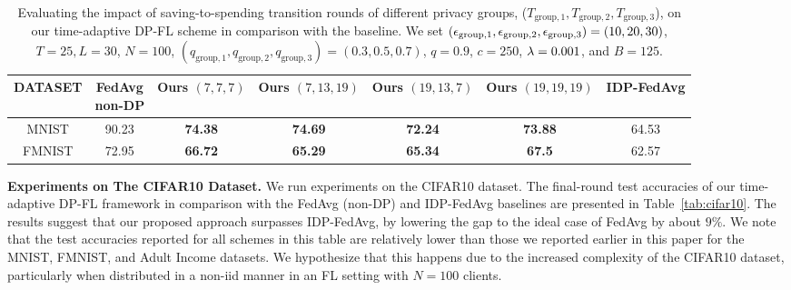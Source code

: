 {\begin{table}[h!]
\centering
\caption{
{Evaluating the impact of saving-to-spending transition rounds of different privacy groups, ($T_{\text{group},1}, T_{\text{group},2}, T_{\text{group},3}$), on our time-adaptive DP-FL scheme in comparison with the baseline. We set $({\epsilon}_{\text{group},1},{\epsilon}_{\text{group},2},{\epsilon}_{\text{group},3})=(10,20,30)$, $T=25, L=30$, $N=100$, $(q_{\text{group},1},q_{\text{group},2},q_{\text{group},3})=(0.3,0.5,0.7)$, $q=0.9$, $c=250$, $\lambda=0.001$, and $B=125$.}}
\small
\setlength{\tabcolsep}{10pt} 
\renewcommand{\arraystretch}{1.2}  
\begin{tabular}{ccccccc}
\toprule
{ \textbf{DATASET}} & \makecell[t]{{\scriptsize\textbf{FedAvg}} \\ {\scriptsize non-DP}} &  \makecell[t]{{\scriptsize\textbf{Ours}} \\ {\scriptsize $(7,7,7)$}} & \makecell[t]{{\scriptsize\textbf{Ours}} \\ {\scriptsize $(7,13,19)$}} & \makecell[t]{{\scriptsize\textbf{Ours}} \\ {\scriptsize $(19,13,7)$}} & \makecell[t]{{\scriptsize\textbf{Ours}} \\ {\scriptsize $(19,19,19)$}} & {\scriptsize \textbf{IDP-FedAvg}}\\ 
\midrule
MNIST & 90.23 & \textbf{74.38}  & \textbf{74.69}  & \textbf{72.24} & \textbf{73.88} & 64.53  \\  
\midrule
FMNIST & 72.95 & \textbf{66.72}  & \textbf{65.29}  & \textbf{65.34} & \textbf{67.5} & 62.57  \\  
\midrule
\end{tabular}
\label{tab:privacy_spending_roundtable}
\end{table}


\textbf{Experiments on The CIFAR10 Dataset.}
{We run experiments on the CIFAR10 dataset. The  
final-round test accuracies of our time-adaptive DP-FL framework in comparison with the FedAvg (non-DP) and IDP-FedAvg baselines
are presented in Table~\ref{tab:cifar10}. The results suggest that our proposed approach surpasses IDP-FedAvg, by lowering the gap to the ideal case of FedAvg by about $9\%$. We note that the test accuracies reported for all schemes in this table are relatively lower than those we reported earlier in this paper for the MNIST, FMNIST, and Adult Income datasets. We hypothesize that this happens due to the increased complexity of the CIFAR10 dataset, particularly when distributed in a non-iid manner in an FL setting with $N=100$ clients.   
}

}

